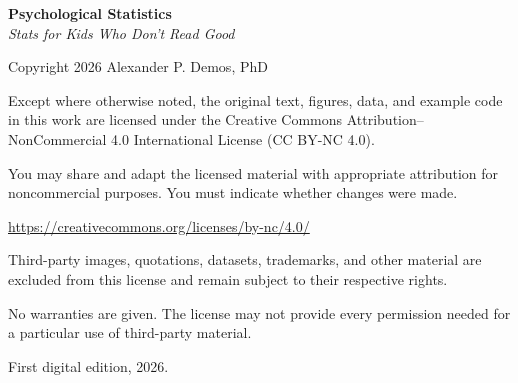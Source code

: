 \clearpage
\thispagestyle{empty}
\mbox{}
\vfill

\begin{flushleft}
\small

\textbf{Psychological Statistics}\\
\textit{Stats for Kids Who Don't Read Good}

\vspace{1.2em}

Copyright \textcopyright{} 2026 Alexander P. Demos, PhD

\vspace{1.2em}

Except where otherwise noted, the original text, figures, data, and example
code in this work are licensed under the Creative Commons
Attribution--NonCommercial 4.0 International License (CC BY-NC 4.0).

You may share and adapt the licensed material with appropriate attribution for
noncommercial purposes. You must indicate whether changes were made.

\url{https://creativecommons.org/licenses/by-nc/4.0/}

\vspace{1.2em}

Third-party images, quotations, datasets, trademarks, and other material are
excluded from this license and remain subject to their respective rights.

No warranties are given. The license may not provide every permission needed
for a particular use of third-party material.

\vspace{1.2em}

First digital edition, 2026.

\end{flushleft}

\clearpage
